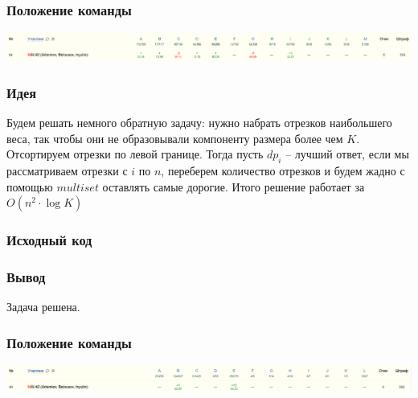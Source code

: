 \subsubsection*{Положение команды}
\includegraphics[scale=0.25]{images/220201.png}\newline\noindent
\pagebreak


\subsubsection*{Идея}
Будем решать немного обратную задачу: нужно набрать отрезков наибольшего веса, так чтобы они не образовывали компоненту размера более чем $K$. Отсортируем отрезки по левой границе. Тогда пусть $dp_{i}$ -- лучший ответ, если мы рассматриваем отрезки с $i$ по $n$, переберем количество отрезков и будем жадно с помощью $multiset$ оставлять самые дорогие. Итого решение работает за $O(n^2 \cdot \log{K})$
\subsubsection*{Исходный код}

\subsubsection*{Вывод}
Задача решена.
\subsubsection*{Положение команды}
\includegraphics[scale=0.25]{images/220202.png}\newline\noindent
\pagebreak



